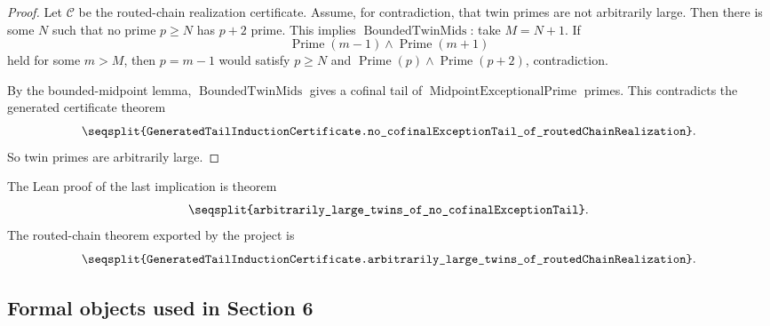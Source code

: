 \documentclass[11pt]{article}
\newcommand{\Prime}{\operatorname{Prime}}
\newcommand{\Lean}[1]{\texttt{\seqsplit{#1}}}
\begin{document}
\begin{proof}
Let \(\mathcal C\) be the routed-chain realization certificate.
Assume, for contradiction, that twin primes are not arbitrarily large.  Then
there is some \(N\) such that no prime \(p\ge N\) has \(p+2\) prime.  This
implies \(\operatorname{BoundedTwinMids}\): take \(M=N+1\).  If
\[
  \Prime(m-1)\wedge\Prime(m+1)
\]
held for some \(m>M\), then \(p=m-1\) would satisfy \(p\ge N\) and
\(\Prime(p)\wedge\Prime(p+2)\), contradiction.

By the bounded-midpoint lemma, \(\operatorname{BoundedTwinMids}\) gives a
cofinal tail of \(\operatorname{MidpointExceptionalPrime}\) primes.  This
contradicts the generated certificate theorem
\[
  \Lean{GeneratedTailInductionCertificate.no\_cofinalExceptionTail\_of\_routedChainRealization}.
\]
So twin primes are arbitrarily large.
\end{proof}

The Lean proof of the last implication is theorem
\[
  \Lean{arbitrarily\_large\_twins\_of\_no\_cofinalExceptionTail}.
\]
The routed-chain theorem exported by the project is
\[
  \Lean{GeneratedTailInductionCertificate.arbitrarily\_large\_twins\_of\_routedChainRealization}.
\]

\subsection{Formal objects used in Section 6}
\end{document}
